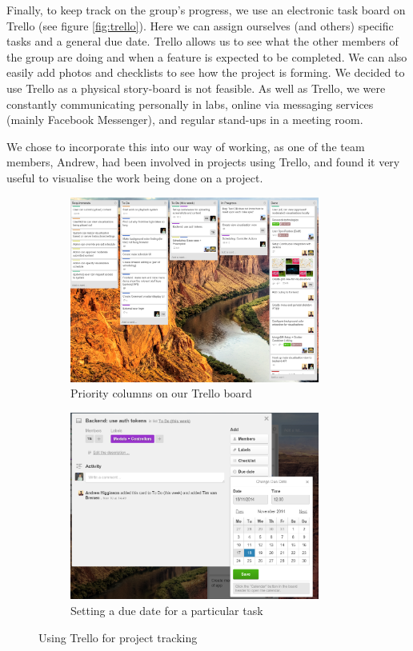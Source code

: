 \documentclass[a4paper, titlepage]{article}
\begin{document}
Finally, to keep track on the group's progress, we use an electronic task
board on Trello (see figure \ref{fig:trello}). Here we can assign ourselves (and others) specific tasks and a general due date. Trello allows us to see what the other members of the group are doing and when a feature is expected to be completed. We can also easily add photos and checklists to see how the project is forming. We decided to use Trello as a physical story-board is not feasible. As well as Trello, we were constantly communicating personally in labs, online via messaging services (mainly Facebook Messenger), and regular stand-ups in a meeting room.

We chose to incorporate this into our way of working, as one of the team members, Andrew, had been involved in projects using Trello, and found it very useful to visualise the work being done on a project.

\begin{figure}[ht]
  \begin{subfigure}{0.5\textwidth}
    \centering
    \includegraphics[width = 0.9\textwidth]{./eval/trello-columns.png}
    \caption{Priority columns on our Trello board}
  \end{subfigure}
  \begin{subfigure}{0.5\textwidth}
    \centering
    \includegraphics[width = 0.9\textwidth]{./eval/trello-due-date.png}
    \caption{Setting a due date for a particular task}
  \end{subfigure}
  \caption{Using Trello for project tracking}
  \label{fig:eval_trello}
\end{figure}
\end{document}
